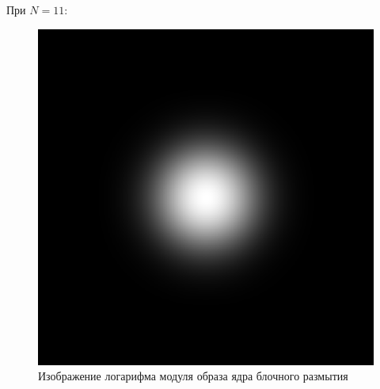 \documentclass[a4paper]{article}
\begin{document}
При $N = 11$:

\begin{figure}[H]
    \centering
    \includegraphics[width=0.51\linewidth]{2/11_abs_fourier_log_norm_gaussian.png}
    \caption{Изображение логарифма модуля образа ядра блочного размытия}
\end{figure}\
\end{document}
